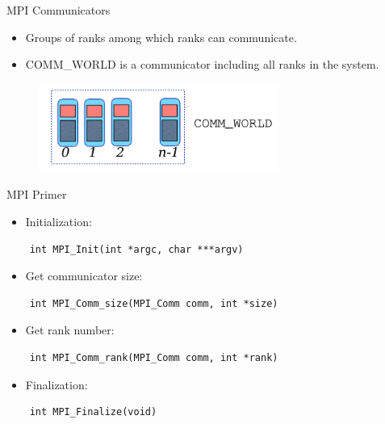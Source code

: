 \begin{frame}{MPI Communicators}
    \begin{itemize}
    \item Groups of ranks among which ranks can communicate.
    \vspace{2mm}
    \item COMM\_WORLD is a communicator including all ranks in the system.
    \vspace{2mm}
    \end{itemize}
    
    \begin{figure}
    \centering
    \includegraphics[width=0.7\textwidth]{img/communicators.png}
    \end{figure} 
    
\end{frame}

\begin{frame}[fragile]{MPI Primer}


\begin{itemize}
\item Initialization:
\end{itemize}
    \begin{verbatim}
    int MPI_Init(int *argc, char ***argv)
    \end{verbatim}
    \vspace{-3mm}
\begin{itemize}
\item Get communicator size:
\end{itemize}
    \begin{verbatim}
    int MPI_Comm_size(MPI_Comm comm, int *size)
    \end{verbatim}
    \vspace{-3mm}
\begin{itemize}
\item Get rank number:
\end{itemize}
    \begin{verbatim}
    int MPI_Comm_rank(MPI_Comm comm, int *rank)
    \end{verbatim}
    \vspace{-3mm}
\begin{itemize}
\item Finalization:
\end{itemize}
    \begin{verbatim}
    int MPI_Finalize(void)
    \end{verbatim}

    
\end{frame}

